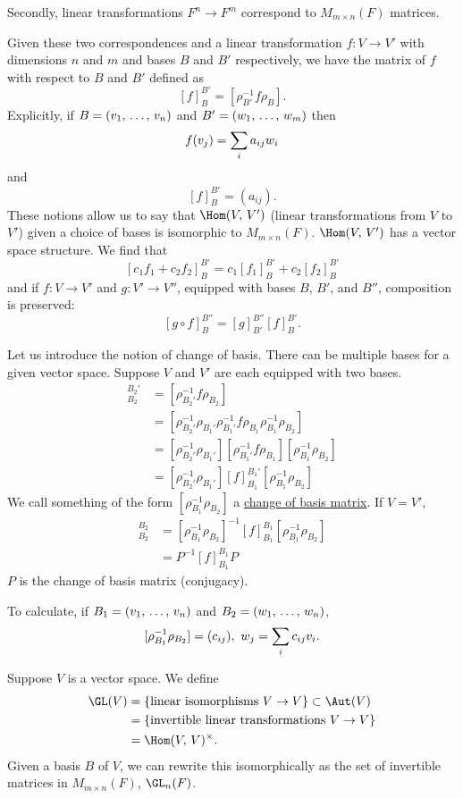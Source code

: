 \documentclass[11pt, oneside]{amsart}
\numberwithin{equation}{section}
\numberwithin{theorem}{section}
\theoremstyle{definition}
\let\bf\relax
\begin{document}
Secondly, linear transformations $F^n\to F^m$ correspond to $M_{m\times n} (F)$ matrices.

Given these two correspondences and a linear transformation $f :V \to V'$ with dimensions $n$ and $m$ and bases $B$ and $B'$ respectively, we have the matrix of $f$ with respect to $B$ and $B'$ defined as 
$$
[f]_B^{B'} = [\rho_{B'}^{-1} f\rho_B].
$$
Explicitly, if $B=(\bf{v}_1,\,\hdots,\, \bf{v}_n)$ and $B'=(\bf{w}_1,\,\hdots,\, \bf{w}_m)$ then 
$$
f(\bf{v}_j) = \sum_i a_{ij}\bf{w}_i
$$
and
$$
[f]_B^{B'} = (a_{ij}).
$$
These notions allow us to say that $\Hom(V,\,V')$ (linear transformations from $V$ to $V'$) given a choice of bases is isomorphic to $M_{m\times n}(F)$. $\Hom(V,\,V')$ has a vector space structure. We find that
$$
[c_1f_1+c_2f_2]_B^{B'} = c_1[f_1]_B^{B'} + c_2[f_2]_B^{B'}
$$
and if $f:V\to V'$ and $g:V'\to V''$, equipped with bases $B$, $B'$, and $B''$, composition is preserved:
$$
[g\circ f]_B^{B''} = [g]_{B'}^{B''} [f]_B^{B'}.
$$

Let us introduce the notion of change of basis. There can be multiple bases for a given vector space. Suppose $V$ and $V'$ are each equipped with two bases.
\begin{align*}
[f]_{B_2}^{B_2'} &=  [\rho_{B_2'}^{-1} f\rho_{B_2}]\\
			 &=  [\rho_{B_2'}^{-1}\rho_{B_1'}\rho_{B_1'}^{-1}f\rho_{B_1}\rho_{B_1}^{-1}\rho_{B_2}]\\
			 &=  [\rho_{B_2'}^{-1}\rho_{B_1'}][\rho_{B_1'}^{-1}f\rho_{B_1}][\rho_{B_1}^{-1}\rho_{B_2}]\\
			 &=  [\rho_{B_2'}^{-1}\rho_{B_1'}][f]_{B_1}^{B_1'}[\rho_{B_1}^{-1}\rho_{B_2}]
\end{align*}
We call something of the form $[\rho_{B_1}^{-1} \rho_{B_2}]$ a \underline{change of basis matrix}. If $V=V'$,
\begin{align*}
[f]_{B_2}^{B_2} &=  [\rho_{B_1}^{-1}\rho_{B_2}]^{-1}[f]_{B_1}^{B_1}[\rho_{B_1}^{-1}\rho_{B_2}]\\
			&=  P^{-1}[f]_{B_1}^{B_1}P
\end{align*}
$P$ is the change of basis matrix (conjugacy). 

To calculate, if $B_1 = (\bf{v}_1,\,\hdots,\, \bf{v}_n)$ and $B_2 = (\bf{w}_1,\,\hdots,\, \bf{w}_n)$, 
$$
[\rho_{B_1}^{-1}\rho_{B_2}] = (c_{ij}),\  \bf{w}_j = \sum_i c_{ij}\bf{v}_i.
$$

Suppose $V$ is a vector space. We define
\begin{align*}
 \GL(V)  	&= \{\textrm{linear isomorphisms }V\to V\} \subset \Aut(V)\\
		&= \{\textrm{invertible linear transformations }V\to V\} \\
		&= \Hom(V,\,V)^\times.
\end{align*}
Given a basis $B$ of $V$, we can rewrite this isomorphically as the set of invertible matrices in $M_{m\times n}(F)$, $\GL_n(F)$.
\end{document}
